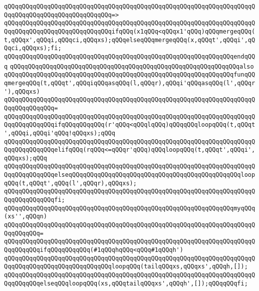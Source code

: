 \verb|qQQqqQQqqQQqqQQqqQQqqQQqqQQqqQQqqQQqqQQqqQQqqQQqqQQqqQQqqQQqqQQqqQQqqQQqqQQqqQQqqQQqqQQqqQQqqQQqqQQq=>|\newline
\verb|qQQqqQQqqQQqqQQqqQQqqQQqqQQqqQQqqQQqqQQqqQQqqQQqqQQqqQQqqQQqqQQqqQQqqQQqqQQqqQQqqQQqqQQqqQQqqQQqqQQqifqQQq(x1qQQq<qQQqx1'qQQq)qQQqmergeqQQq(t,qQQqx',qQQqi,qQQqci,qQQqxs);qQQqelseqQQqmergeqQQq(x,qQQqt',qQQqi',qQQqci,qQQqxs);fi;|\newline
\verb|qQQqqQQqqQQqqQQqqQQqqQQqqQQqqQQqqQQqqQQqqQQqqQQqqQQqqQQqqQQqqQQqendqQQq|\newline
\newline
\verb|qQQqqQQqqQQqqQQqqQQqqQQqqQQqqQQqqQQqqQQqqQQqqQQqqQQqqQQqqQQqqQQqalso|\newline
\verb|qQQqqQQqqQQqqQQqqQQqqQQqqQQqqQQqqQQqqQQqqQQqqQQqqQQqqQQqqQQqqQQqfunqQQqmergeqQQq(t,qQQqt',qQQqiqQQqasqQQq(l,qQQqr),qQQqi'qQQqasqQQq(l',qQQqr'),qQQqxs)|\newline
\verb|qQQqqQQqqQQqqQQqqQQqqQQqqQQqqQQqqQQqqQQqqQQqqQQqqQQqqQQqqQQqqQQqqQQqqQQqqQQqqQQqqQQq=|\newline
\verb|qQQqqQQqqQQqqQQqqQQqqQQqqQQqqQQqqQQqqQQqqQQqqQQqqQQqqQQqqQQqqQQqqQQqqQQqqQQqqQQqqQQqifqQQqqQQqqQQq(r'qQQq<qQQqlqQQq)qQQqqQQqloopqQQq(t,qQQqt',qQQqi,qQQqi'qQQq!qQQqxs);qQQq|\newline
\verb|qQQqqQQqqQQqqQQqqQQqqQQqqQQqqQQqqQQqqQQqqQQqqQQqqQQqqQQqqQQqqQQqqQQqqQQqqQQqqQQqqQQqelifqQQq(rqQQq<=qQQqr'qQQq)qQQqloopqQQq(t,qQQqt',qQQqi',qQQqxs);qQQq|\newline
\verb|qQQqqQQqqQQqqQQqqQQqqQQqqQQqqQQqqQQqqQQqqQQqqQQqqQQqqQQqqQQqqQQqqQQqqQQqqQQqqQQqqQQqelseqQQqqQQqqQQqqQQqqQQqqQQqqQQqqQQqqQQqqQQqqQQqqQQqloopqQQq(t,qQQqt',qQQq(l',qQQqr),qQQqxs);|\newline
\verb|qQQqqQQqqQQqqQQqqQQqqQQqqQQqqQQqqQQqqQQqqQQqqQQqqQQqqQQqqQQqqQQqqQQqqQQqqQQqqQQqqQQqfi;|\newline
\newline
\verb|qQQqqQQqqQQqqQQqqQQqqQQqqQQqqQQqqQQqqQQqqQQqqQQqqQQqqQQqqQQqqQQqmyqQQq(xs'',qQQqn)|\newline
\verb|qQQqqQQqqQQqqQQqqQQqqQQqqQQqqQQqqQQqqQQqqQQqqQQqqQQqqQQqqQQqqQQqqQQqqQQqqQQqqQQq=|\newline
\verb|qQQqqQQqqQQqqQQqqQQqqQQqqQQqqQQqqQQqqQQqqQQqqQQqqQQqqQQqqQQqqQQqqQQqqQQqqQQqqQQqifqQQqqQQqqQQq(#1qQQqhqQQq<qQQq#1qQQqh')|\newline
\verb|qQQqqQQqqQQqqQQqqQQqqQQqqQQqqQQqqQQqqQQqqQQqqQQqqQQqqQQqqQQqqQQqqQQqqQQqqQQqqQQqqQQqqQQqqQQqqQQqqQQqloopqQQq(tailqQQqxs,qQQqxs',qQQqh,[]);|\newline
\verb|qQQqqQQqqQQqqQQqqQQqqQQqqQQqqQQqqQQqqQQqqQQqqQQqqQQqqQQqqQQqqQQqqQQqqQQqqQQqqQQqelseqQQqloopqQQq(xs,qQQqtailqQQqxs',qQQqh',[]);qQQqqQQqfi;|\newline
